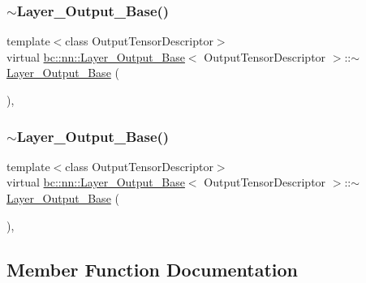 \subsubsection{\texorpdfstring{$\sim$\+Layer\+\_\+\+Output\+\_\+\+Base()}{~Layer\_Output\_Base()}\hspace{0.1cm}{\footnotesize\ttfamily [1/2]}}
{\footnotesize\ttfamily template$<$class Output\+Tensor\+Descriptor$>$ \\
virtual \hyperlink{structbc_1_1nn_1_1Layer__Output__Base}{bc\+::nn\+::\+Layer\+\_\+\+Output\+\_\+\+Base}$<$ Output\+Tensor\+Descriptor $>$\+::$\sim$\hyperlink{structbc_1_1nn_1_1Layer__Output__Base}{Layer\+\_\+\+Output\+\_\+\+Base} (\begin{DoxyParamCaption}{ }\end{DoxyParamCaption})\hspace{0.3cm}{\ttfamily [inline]}, {\ttfamily [virtual]}}

\mbox{\label{structbc_1_1nn_1_1Layer__Output__Base_a4ac27a579c01108c3ed2a7a95010382b}} 
\subsubsection{\texorpdfstring{$\sim$\+Layer\+\_\+\+Output\+\_\+\+Base()}{~Layer\_Output\_Base()}\hspace{0.1cm}{\footnotesize\ttfamily [2/2]}}
{\footnotesize\ttfamily template$<$class Output\+Tensor\+Descriptor$>$ \\
virtual \hyperlink{structbc_1_1nn_1_1Layer__Output__Base}{bc\+::nn\+::\+Layer\+\_\+\+Output\+\_\+\+Base}$<$ Output\+Tensor\+Descriptor $>$\+::$\sim$\hyperlink{structbc_1_1nn_1_1Layer__Output__Base}{Layer\+\_\+\+Output\+\_\+\+Base} (\begin{DoxyParamCaption}{ }\end{DoxyParamCaption})\hspace{0.3cm}{\ttfamily [inline]}, {\ttfamily [virtual]}}



\subsection{Member Function Documentation}
\mbox{\label{structbc_1_1nn_1_1Layer__Output__Base_a5f43dd4ad641db100b847d33843ef837}} 
